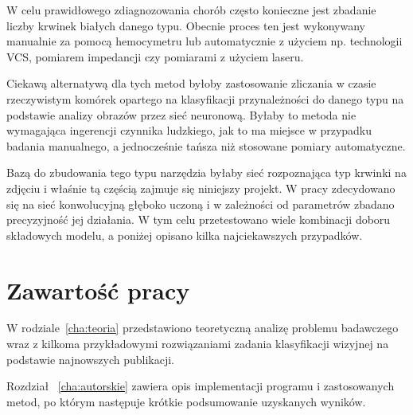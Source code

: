 W celu prawidłowego zdiagnozowania chorób często konieczne jest zbadanie liczby krwinek białych danego typu. Obecnie proces ten jest wykonywany manualnie za pomocą hemocymetru lub automatycznie z użyciem np. technologii VCS, pomiarem impedancji czy pomiarami z użyciem laseru. 

Ciekawą alternatywą dla tych metod byłoby zastosowanie zliczania w czasie rzeczywistym komórek opartego na klasyfikacji przynależności do danego typu na podstawie analizy obrazów przez sieć neuronową. Byłaby to metoda nie wymagająca ingerencji czynnika ludzkiego, jak to ma miejsce w przypadku badania manualnego, a jednocześnie tańsza niż stosowane pomiary automatyczne.

Bazą do zbudowania tego typu narzędzia byłaby sieć rozpoznająca typ krwinki na zdjęciu i właśnie tą częścią zajmuje się niniejszy projekt. W pracy zdecydowano się na sieć konwolucyjną głęboko uczoną i w zależności od parametrów zbadano precyzyjność jej działania. W tym celu przetestowano wiele kombinacji doboru składowych modelu, a poniżej opisano kilka najciekawszych przypadków.


\section{Zawartość pracy}
\label{sec:zawartoscPracy}

W rodziale~\ref{cha:teoria} przedstawiono teoretyczną analizę problemu badawczego wraz z kilkoma przykładowymi rozwiązaniami zadania klasyfikacji wizyjnej na podstawie najnowszych publikacji.


Rozdział ~\ref{cha:autorskie} zawiera opis implementacji programu i zastosowanych metod, po którym następuje krótkie podsumowanie uzyskanych wyników. 

